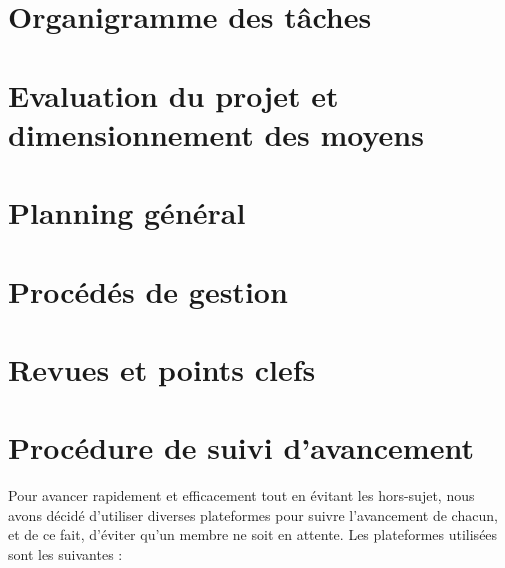 \chapter{Organigramme des tâches}

\chapter{Evaluation du projet et dimensionnement des moyens}

\chapter{Planning général}

\chapter{Procédés de gestion}

\chapter{Revues et points clefs}

\chapter{Procédure de suivi d'avancement}

Pour avancer rapidement et efficacement tout en évitant les hors-sujet, nous avons
décidé d’utiliser diverses plateformes pour suivre l’avancement de chacun, et de ce fait,
d’éviter qu’un membre ne soit en attente. Les plateformes utilisées sont les suivantes :\\ \newline


